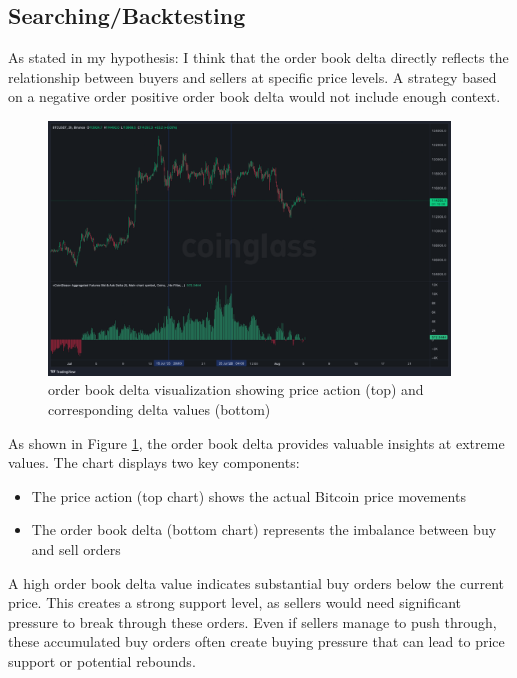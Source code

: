 \documentclass[12pt]{article}
\begin{document}



\newpage

\subsection*{Searching/Backtesting}
As stated in my hypothesis: I think that the order book delta directly reflects the relationship between buyers and sellers at specific price levels. A strategy based on a negative order positive order book delta would not include enough context.

\begin{figure}[h]
    \centering
    \includegraphics[width=0.95\textwidth]{imgs/showcase_chart.png}
    \caption{order book delta visualization showing price action (top) and corresponding delta values (bottom)}
    \label{fig:order book_delta}
\end{figure}

As shown in Figure \ref{fig:order book_delta}, the order book delta provides valuable insights at extreme values. The chart displays two key components:
\begin{itemize}
    \item The price action (top chart) shows the actual Bitcoin price movements
    \item The order book delta (bottom chart) represents the imbalance between buy and sell orders
\end{itemize}

A high order book delta value indicates substantial buy orders below the current price. This creates a strong support level, as sellers would need significant pressure to break through these orders. Even if sellers manage to push through, these accumulated buy orders often create buying pressure that can lead to price support or potential rebounds.
\end{document}
